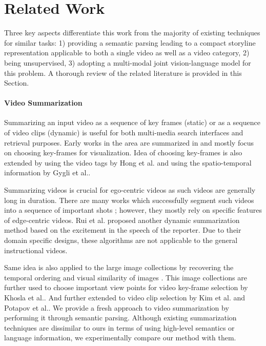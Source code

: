 \section{Related Work}
Three key aspects differentiate this work from the majority of existing techniques for similar tasks: 1) providing a semantic parsing leading to a compact storyline representation applicable to both a single video as well as a video category, 2) being unsupervised, 3) adopting a multi-modal joint vision-language model for this problem. A thorough review of the related literature is provided in this Section.

\paragraph{Video Summarization}
Summarizing an input video as a sequence of key frames (static) or as a sequence of video clips (dynamic) is useful for both multi-media search interfaces and retrieval purposes. Early works in the area are summarized in \cite{vidAbstraction} and mostly focus on choosing key-frames for visualization. Idea of choosing key-frames is also extended by using the video tags by Hong et al.\cite{beyondSearch} and using the spatio-temporal information by Gygli et al.\cite{createSum}.

Summarizing videos is crucial for ego-centric videos as such videos are generally long in duration. There are many works which successfully segment such videos into a sequence of important shots \cite{lee2012discovering, lu2013story}; however, they mostly rely on specific features of edge-centric videos. Rui et al. \cite{rui2000automatically} proposed another dynamic summarization method based on the excitement in the speech of the reporter. Due to their domain specific designs, these algorithms are not applicable to the general instructional videos.

Same idea is also applied to the large image collections by recovering the temporal ordering and visual similarity of images \cite{storyGraph}. This image collections are further used to choose important view points for video key-frame selection by Khosla et al.\cite{khosla2013large}. And further extended to video clip selection by Kim et al.\cite{kim2014joint} and Potapov et al.\cite{potapov2014category}. We provide a fresh approach to video summarization by performing it through semantic parsing. Although existing summarization techniques are dissimilar to ours in terms of using high-level semantics or language information, we experimentally compare our method with them.

